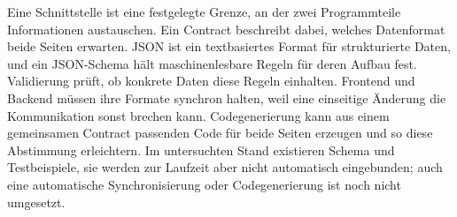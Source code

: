\begin{beginnerstatement}

Eine Schnittstelle ist eine festgelegte Grenze, an der zwei Programmteile
Informationen austauschen. Ein Contract beschreibt dabei, welches Datenformat
beide Seiten erwarten. JSON ist ein textbasiertes Format für strukturierte
Daten, und ein JSON-Schema hält maschinenlesbare Regeln für deren Aufbau fest.
Validierung prüft, ob konkrete Daten diese Regeln einhalten. Frontend und
Backend müssen ihre Formate synchron halten, weil eine einseitige Änderung die
Kommunikation sonst brechen kann. Codegenerierung kann aus einem gemeinsamen
Contract passenden Code für beide Seiten erzeugen und so diese Abstimmung
erleichtern. Im untersuchten Stand existieren Schema und Testbeispiele, sie
werden zur Laufzeit aber nicht automatisch eingebunden; auch eine automatische
Synchronisierung oder Codegenerierung ist noch nicht umgesetzt.

\end{beginnerstatement}
